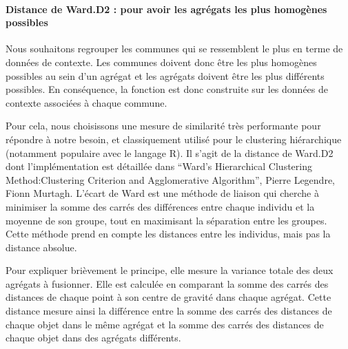 \documentclass[
]{article}
\begin{document}
\hypertarget{distance-de-ward.d2-pour-avoir-les-agruxe9gats-les-plus-homoguxe8nes-possibles}{%
\paragraph{Distance de Ward.D2 : pour avoir les agrégats les plus
homogènes
possibles}\label{distance-de-ward.d2-pour-avoir-les-agruxe9gats-les-plus-homoguxe8nes-possibles}}

Nous souhaitons regrouper les communes qui se ressemblent le plus en
terme de données de contexte. Les communes doivent donc être les plus
homogènes possibles au sein d'un agrégat et les agrégats doivent être
les plus différents possibles. En conséquence, la fonction est donc
construite sur les données de contexte associées à chaque commune.

Pour cela, nous choisissons une mesure de similarité très performante
pour répondre à notre besoin, et classiquement utilisé pour le
clustering hiérarchique (notamment populaire avec le langage R). Il
s'agit de la distance de Ward.D2 dont l'implémentation est détaillée
dans ``Ward's Hierarchical Clustering Method:Clustering Criterion and
Agglomerative Algorithm'', Pierre Legendre, Fionn Murtagh. L'écart de
Ward est une méthode de liaison qui cherche à minimiser la somme des
carrés des différences entre chaque individu et la moyenne de son
groupe, tout en maximisant la séparation entre les groupes. Cette
méthode prend en compte les distances entre les individus, mais pas la
distance absolue.

Pour expliquer brièvement le principe, elle mesure la variance totale
des deux agrégats à fusionner. Elle est calculée en comparant la somme
des carrés des distances de chaque point à son centre de gravité dans
chaque agrégat. Cette distance mesure ainsi la différence entre la somme
des carrés des distances de chaque objet dans le même agrégat et la
somme des carrés des distances de chaque objet dans des agrégats
différents.
\end{document}
